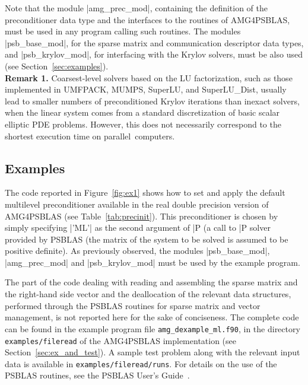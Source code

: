 Note that the module \fortinline|amg_prec_mod|, containing the definition of the
preconditioner data type and the interfaces to the routines of AMG4PSBLAS,
must be used in any program calling such routines.
The modules \fortinline|psb_base_mod|, for the sparse matrix and communication descriptor
data types, and \fortinline|psb_krylov_mod|, for interfacing with the
Krylov solvers, must be also used (see Section~\ref{sec:examples}). \\

\textbf{Remark 1.} Coarsest-level solvers based on the LU factorization,
such as those implemented in UMFPACK, MUMPS, SuperLU, and SuperLU\_Dist,
usually lead to smaller numbers of preconditioned Krylov
iterations than inexact solvers, when the linear system comes from
a standard discretization of basic scalar elliptic PDE problems. However,
this does not necessarily correspond to the shortest execution time
on parallel~computers.


\subsection{Examples\label{sec:examples}}

The code reported in Figure~\ref{fig:ex1} shows how to set and apply the default
multilevel preconditioner available in the real double precision version
of AMG4PSBLAS (see Table~\ref{tab:precinit}). This preconditioner is chosen
by simply specifying \fortinline|'ML'| as the second argument of \fortinline|P%
(a call to \fortinline|P%
solver provided by PSBLAS (the matrix of the system to be solved is
assumed to be positive definite). As previously observed, the modules
\fortinline|psb_base_mod|, \fortinline|amg_prec_mod| and \fortinline|psb_krylov_mod|
must be used by the example program.

The part of the code dealing with reading and assembling  the sparse
matrix and the right-hand side vector and the deallocation of the
relevant data structures, performed 
through the PSBLAS routines for sparse matrix and vector management, is not reported
here for the sake of conciseness.
The complete code can be found in the example program file \verb|amg_dexample_ml.f90|,
in the directory \verb|examples/fileread| of the AMG4PSBLAS implementation (see
Section~\ref{sec:ex_and_test}). A sample test problem along with the relevant
input data is available in \verb|examples/fileread/runs|.
For details on the use of the PSBLAS routines, see the PSBLAS User's
Guide~\cite{PSBLASGUIDE}.

